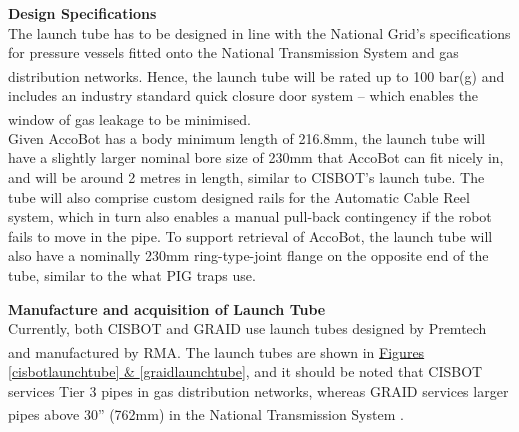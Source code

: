 \documentclass[11pt]{article}		%
\newcommand{\supercite}[1]{\textsuperscript{\cite{#1}}}		%
\begin{document}
    \textbf{Design Specifications}
    \\The launch tube has to be designed in line with the National Grid’s specifications for pressure vessels fitted onto the National Transmission System and gas distribution networks\supercite{NTSstandards}. Hence, the launch tube will be rated up to 100 bar(g) and includes an industry standard quick closure door system – which enables the window of gas leakage to be minimised\supercite{launchtubestandards}.
    \\ \hspace*{3ex}Given AccoBot has a body minimum length of 216.8mm, the launch tube will have a slightly larger nominal bore size of 230mm that AccoBot can fit nicely in, and will be around 2 metres in length, similar to CISBOT’s launch tube. The tube will also comprise custom designed rails for the Automatic Cable Reel system, which in turn also enables a manual pull-back contingency if the robot fails to move in the pipe. To support retrieval of AccoBot, the launch tube will also have a nominally 230mm ring-type-joint flange on the opposite end of the tube, similar to the what PIG traps use. 

    \textbf{Manufacture and acquisition of Launch Tube}
    \\Currently, both CISBOT and GRAID use launch tubes designed by Premtech and manufactured by RMA\supercite{launchtubemfg}.  The launch tubes are shown in \hyperref[cisbotlaunchtube]{Figures \ref*{cisbotlaunchtube} \& \ref*{graidlaunchtube}}, and it should be noted that CISBOT services Tier 3 pipes in gas distribution networks, whereas GRAID services larger pipes above 30” (762mm) in the National Transmission System \supercite{GRAID}. 
\end{document}
